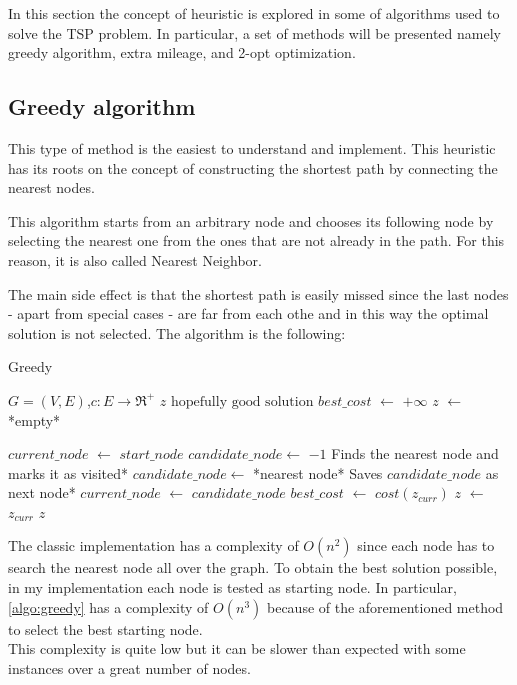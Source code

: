 In this section the concept of heuristic is explored in some of algorithms used to solve the TSP problem. In particular, a set of methods will be presented namely greedy algorithm, extra mileage, and 2-opt optimization.

\subsection{Greedy algorithm}
\label{sec:greedy}
This type of method is the easiest to understand and implement. This heuristic has its roots on the concept  of constructing the shortest path by connecting the nearest nodes.

This algorithm starts from an arbitrary node and chooses its following node by selecting the nearest one from the ones that are not already in the path. For this reason, it is also called Nearest Neighbor.

The main side effect is that the shortest path is easily missed since the last nodes - apart from special cases - are far from each othe and in this way the optimal solution is not selected. The algorithm is the following: 

\begin{algorithm}
	\caption{Greedy}\label{algo:greedy}
	\begin{algorithmic}[1]
		\Require $G=(V,E)$,$ c:E\rightarrow \Re^+$
		\Ensure $z\text{ hopefully good solution}$
		\State $best\_cost$ $\gets$ $+\infty$
		\State $z$ $\gets$ *empty*
		
			\State $current\_node$ $\gets$ $start\_node$
			\State $candidate\_node \gets$ $-1$
					\State *Finds the nearest node and marks it as visited*
					\State $candidate\_node \gets$ *nearest node*
				\EndFor
				\State *Saves $candidate\_node$ as next node*
				\State $current\_node$ $\gets$ $candidate\_node$
			\EndWhile
				\State $best\_cost$ $\gets$ $cost(z_{curr})$
				\State $z$ $\gets$ $z_{curr}$
			\EndIf
		\EndFor
		\State \Return $z$
	\end{algorithmic}
\end{algorithm}

The classic implementation has a complexity of $O(n^2)$ since each node has to search the nearest node all over the graph. To obtain the best solution possible, in my implementation each node is tested as starting node. In particular, \ref{algo:greedy} has a complexity of $O(n^3)$ because of the aforementioned method to select the best starting node.\\
This complexity is quite low but it can be slower than expected with some instances over a great number of nodes.

